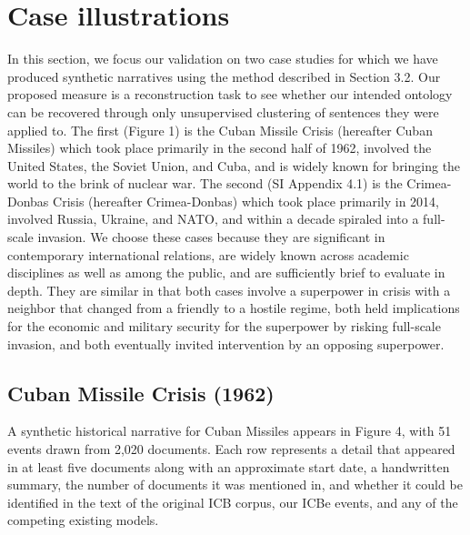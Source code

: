 \documentclass{article}
\begin{document}
\hypertarget{case-illustrations}{%
\section{Case illustrations}\label{case-illustrations}}

In this section, we focus our validation on two case studies for which
we have produced synthetic narratives using the method described in
Section 3.2. Our proposed measure is a reconstruction task to see
whether our intended ontology can be recovered through only unsupervised
clustering of sentences they were applied to. The first (Figure 1) is
the Cuban Missile Crisis (hereafter Cuban Missiles) which took place
primarily in the second half of 1962, involved the United States, the
Soviet Union, and Cuba, and is widely known for bringing the world to
the brink of nuclear war. The second (SI Appendix 4.1) is the
Crimea-Donbas Crisis (hereafter Crimea-Donbas) which took place
primarily in 2014, involved Russia, Ukraine, and NATO, and within a
decade spiraled into a full-scale invasion. We choose these cases
because they are significant in contemporary international relations,
are widely known across academic disciplines as well as among the
public, and are sufficiently brief to evaluate in depth. They are
similar in that both cases involve a superpower in crisis with a
neighbor that changed from a friendly to a hostile regime, both held
implications for the economic and military security for the superpower
by risking full-scale invasion, and both eventually invited intervention
by an opposing superpower.

\hypertarget{cuban-missile-crisis-1962}{%
\subsection{Cuban Missile Crisis
(1962)}\label{cuban-missile-crisis-1962}}

A synthetic historical narrative for Cuban Missiles appears in Figure 4,
with 51 events drawn from 2,020 documents. Each row represents a detail
that appeared in at least five documents along with an approximate start
date, a handwritten summary, the number of documents it was mentioned
in, and whether it could be identified in the text of the original ICB
corpus, our ICBe events, and any of the competing existing models.
\end{document}
